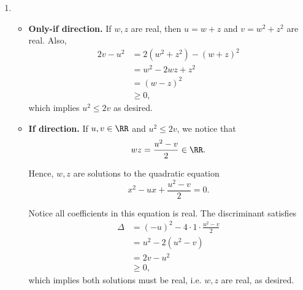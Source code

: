 \Question{\currfilebase}

\begin{enumerate}
    \item \begin{itemize}
              \item \textbf{Only-if direction.} If \(w, z\) are real, then \(u = w + z\) and \(v = w^2 + z^2\) are real. Also,
                    \begin{align*}
                        2v - u^2 & = 2(w^2 + z^2) - (w + z)^2 \\
                                 & = w^2 - 2wz + z^2          \\
                                 & = (w - z)^2                \\
                                 & \geq 0,
                    \end{align*}
                    which implies \(u^2 \leq 2v\) as desired.

              \item \textbf{If direction.} If \(u, v \in \RR\) and \(u^2 \leq 2v\), we notice that
                    \[
                        wz = \frac{u^2 - v}{2} \in \RR.
                    \]

                    Hence, \(w, z\) are solutions to the quadratic equation
                    \[
                        x^2 - ux + \frac{u^2 - v}{2} = 0.
                    \]

                    Notice all coefficients in this equation is real. The discriminant satisfies
                    \begin{align*}
                        \Delta & = (-u)^2 - 4 \cdot 1 \cdot \frac{u^2 - v}{2} \\
                               & = u^2 - 2(u^2 - v)                           \\
                               & = 2v - u^2                                   \\
                               & \geq 0,
                    \end{align*}
                    which implies both solutions must be real, i.e. \(w, z\) are real, as desired.
          \end{itemize}


\end{enumerate}
